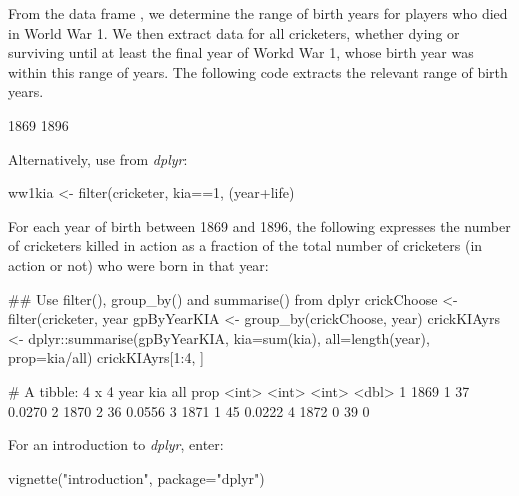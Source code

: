 From the data frame , we determine the range of birth
years for players who died in World War 1.  We then extract data for
all cricketers, whether dying or surviving until at least the final
year of Workd War 1, whose birth year was within this range of years.
The following code extracts the relevant range of birth years.
\begin{Schunk}
\begin{Soutput}
[1] 1869 1896
\end{Soutput}
\end{Schunk}

Alternatively, use  from {\em dplyr}:
\begin{Schunk}
\begin{Sinput}
ww1kia <- filter(cricketer,
                 kia==1, (year+life)%in% 1914:1918)
\end{Sinput}
\end{Schunk}

For each year of birth between 1869 and 1896, the following expresses
the number of cricketers killed in action as a fraction of the total
number of cricketers (in action or not) who were born in that year:
\begin{fullwidth}
\begin{Schunk}
\begin{Sinput}
## Use filter(), group_by() and summarise() from dplyr
crickChoose <- filter(cricketer,
                      year%in%(1869:1896), ((kia==1)|(year+life)>1918))
gpByYearKIA <- group_by(crickChoose, year)
crickKIAyrs <- dplyr::summarise(gpByYearKIA,
                                kia=sum(kia), all=length(year), prop=kia/all)
crickKIAyrs[1:4, ]
\end{Sinput}
\begin{Soutput}
# A tibble: 4 x 4
   year   kia   all   prop
  <int> <int> <int>  <dbl>
1  1869     1    37 0.0270
2  1870     2    36 0.0556
3  1871     1    45 0.0222
4  1872     0    39 0     
\end{Soutput}
\end{Schunk}
\end{fullwidth}

For an introduction to {\em dplyr}, enter:
\begin{Schunk}
\begin{Sinput}
vignette("introduction", package="dplyr")
\end{Sinput}
\end{Schunk}

